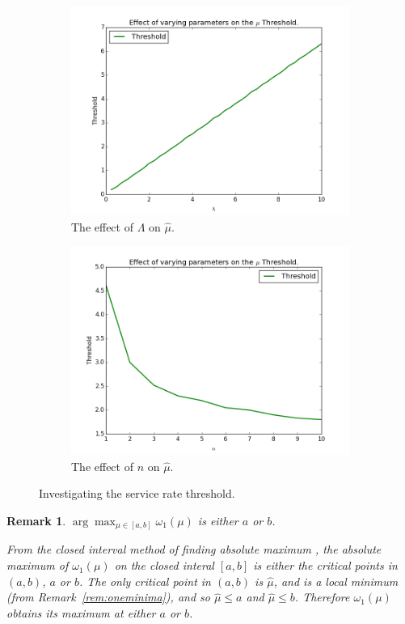 \documentclass{article}
\newtheorem{remark}{Remark}
\begin{document}
\begin{figure}[!htbp]
\begin{subfigure}[b]{0.5\textwidth}
    \includegraphics[width=\textwidth]{images/plot_thresholds_L}
    \caption{The effect of $\Lambda$ on $\hat{\mu}$.}
    \label{fig:threshold_L}
  \end{subfigure}
  \begin{subfigure}[b]{0.5\textwidth}
    \includegraphics[width=\textwidth]{images/plot_thresholds_n}
    \caption{The effect of $n$ on $\hat{\mu}$.}
    \label{fig:threshold_n}
  \end{subfigure}
  \caption{Investigating the service rate threshold.}
  \label{fig:threshold_investigate}
\end{figure}

\begin{remark}\label{rem:findmaximum}
$\arg\max_{\mu \in [a, b]} \omega_1(\mu)$ is either $a$ or $b$.

From the closed interval method of finding absolute maximum \cite{tan09}, the absolute maximum of $\omega_1(\mu)$ on the closed interal $[a, b]$ is either the critical points in $(a, b)$, $a$ or $b$.
The only critical point in $(a, b)$ is $\hat{\mu}$, and is a local minimum (from Remark~\ref{rem:oneminima}), and so $\hat{\mu} \leq a$ and $\hat{\mu} \leq b$.
Therefore $\omega_1(\mu)$ obtains its maximum at either $a$ or $b$.
\end{remark}
\end{document}
